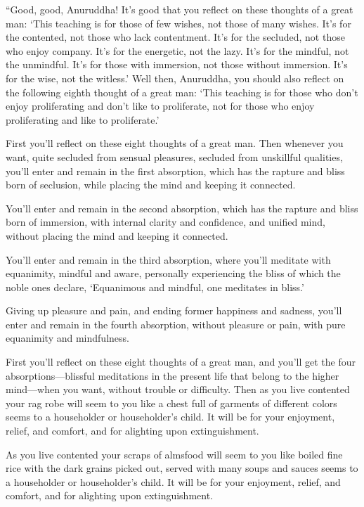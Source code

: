 \documentclass[12pt,openany]{book}%
\begin{document}
“Good, good, Anuruddha! It’s good that you reflect on these thoughts of a great man: ‘This teaching is for those of few wishes, not those of many wishes. It’s for the contented, not those who lack contentment. It’s for the secluded, not those who enjoy company. It’s for the energetic, not the lazy. It’s for the mindful, not the unmindful. It’s for those with immersion, not those without immersion. It’s for the wise, not the witless.’ Well then, Anuruddha, you should also reflect on the following eighth thought of a great man: ‘This teaching is for those who don’t enjoy proliferating and don’t like to proliferate, not for those who enjoy proliferating and like to proliferate.’ 

First you’ll reflect on these eight thoughts of a great man. Then whenever you want, quite secluded from sensual pleasures, secluded from unskillful qualities, you’ll enter and remain in the first absorption, which has the rapture and bliss born of seclusion, while placing the mind and keeping it connected. 

You’ll enter and remain in the second absorption, which has the rapture and bliss born of immersion, with internal clarity and confidence, and unified mind, without placing the mind and keeping it connected. 

You’ll enter and remain in the third absorption, where you’ll meditate with equanimity, mindful and aware, personally experiencing the bliss of which the noble ones declare, ‘Equanimous and mindful, one meditates in bliss.’ 

Giving up pleasure and pain, and ending former happiness and sadness, you’ll enter and remain in the fourth absorption, without pleasure or pain, with pure equanimity and mindfulness. 

First you’ll reflect on these eight thoughts of a great man, and you’ll get the four absorptions—blissful meditations in the present life that belong to the higher mind—when you want, without trouble or difficulty. Then as you live contented your rag robe will seem to you like a chest full of garments of different colors seems to a householder or householder’s child. It will be for your enjoyment, relief, and comfort, and for alighting upon extinguishment. 

As you live contented your scraps of almsfood will seem to you like boiled fine rice with the dark grains picked out, served with many soups and sauces seems to a householder or householder’s child. It will be for your enjoyment, relief, and comfort, and for alighting upon extinguishment. 
\end{document}
